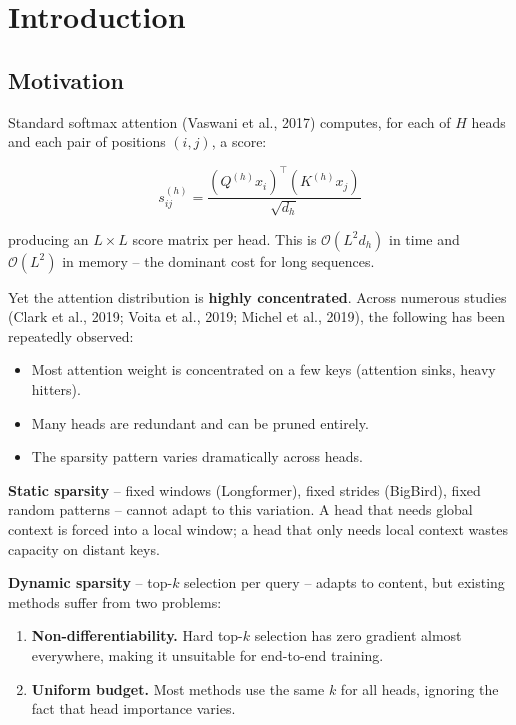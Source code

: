 
\section{Introduction}

\subsection{Motivation}

Standard softmax attention (Vaswani et al., 2017) computes, for each of $H$ 
heads and each pair of positions $(i, j)$, a score:

\[
s_{ij}^{(h)} = \frac{(Q^{(h)} x_i)^\top (K^{(h)} x_j)}{\sqrt{d_h}}
\]

producing an $L \times L$ score matrix per head. This is $\mathcal{O}(L^2 d_h)$ 
in time and $\mathcal{O}(L^2)$ in memory -- the dominant cost for long sequences.

Yet the attention distribution is \textbf{highly concentrated}. Across numerous 
studies (Clark et al., 2019; Voita et al., 2019; Michel et al., 2019), the 
following has been repeatedly observed:

\begin{itemize}
\item Most attention weight is concentrated on a few keys (attention sinks,
  heavy hitters).
\item Many heads are redundant and can be pruned entirely.
\item The sparsity pattern varies dramatically across heads.

\end{itemize}
\textbf{Static sparsity} -- fixed windows (Longformer), fixed strides (BigBird), 
fixed random patterns -- cannot adapt to this variation. A head that needs 
global context is forced into a local window; a head that only needs local 
context wastes capacity on distant keys.

\textbf{Dynamic sparsity} -- top-$k$ selection per query -- adapts to content, but 
existing methods suffer from two problems:

\begin{enumerate}
\item \textbf{Non-differentiability.} Hard top-$k$ selection has zero gradient
  almost everywhere, making it unsuitable for end-to-end training.
\item \textbf{Uniform budget.} Most methods use the same $k$ for all heads, ignoring
  the fact that head importance varies.

\end{enumerate}
